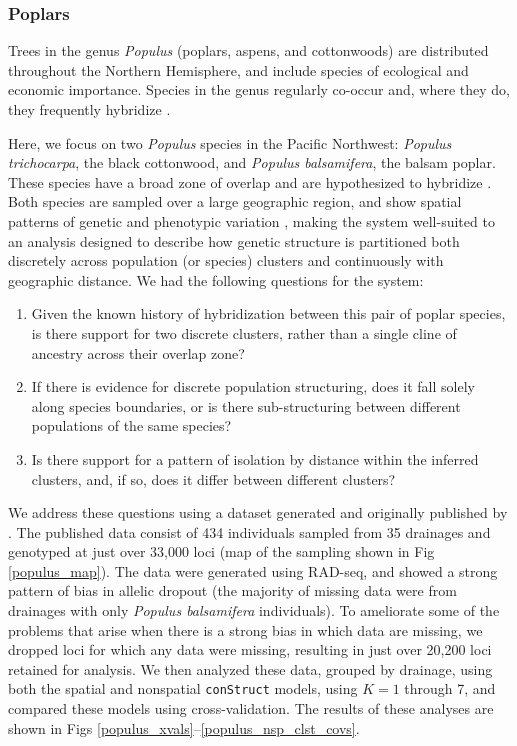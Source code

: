 \documentclass[12pt]{article}
\begin{document}
\subsubsection*{Poplars}

Trees in the genus \textit{Populus} (poplars, aspens, and cottonwoods) 
are distributed throughout the Northern Hemisphere, 
and include species of ecological and economic importance.
Species in the genus regularly co-occur and, 
where they do, they frequently hybridize \citep{eckenwalder1984, Cronk2005}.

Here, we focus on two \textit{Populus} species in the Pacific Northwest: 
\textit{Populus trichocarpa}, the black cottonwood,
and \textit{Populus balsamifera}, the balsam poplar.
These species have a broad zone of overlap and are hypothesized to hybridize \citep{geraldes_etal_2014, suarezgonzalez_etal_2016}.
Both species are sampled over a large geographic region, 
and show spatial patterns of genetic and phenotypic variation \citep{slavov_etal_2012, mckown_etal_2013},
making the system well-suited to an analysis designed to describe
how genetic structure is partitioned both discretely across population (or species) clusters
and continuously with geographic distance.
We had the following questions for the system: 
\begin{enumerate}
\item Given the known history of hybridization between this pair of poplar species, 
is there support for two discrete clusters, 
rather than a single cline of ancestry across their overlap zone?
\item If there is evidence for discrete population structuring, 
does it fall solely along species boundaries, 
or is there sub-structuring between different populations of the same species?
\item Is there support for a pattern of isolation by distance within
the inferred clusters, and, if so, 
does it differ between different clusters?
\end{enumerate}

We address these questions using a dataset generated and originally published by \cite{geraldes_etal_2014}.
The published data consist of 434 individuals sampled from 35 drainages 
and genotyped at just over 33,000 loci (map of the sampling shown in Fig \ref{populus_map}).
The data were generated using RAD-seq, 
and showed a strong pattern of bias in allelic dropout 
(the majority of missing data were from drainages with only \textit{Populus balsamifera} individuals).
To ameliorate some of the problems that arise when there is a strong bias in which data are missing, 
we dropped loci for which any data were missing, 
resulting in just over 20,200 loci retained for analysis.  
We then analyzed these data, grouped by drainage, using both the spatial and nonspatial \texttt{conStruct} models, 
using $K = 1$ through 7,
and compared these models using cross-validation.
The results of these analyses are shown in 
Figs \ref{populus_xvals}--\ref{populus_nsp_clst_covs}. %
\end{document}
